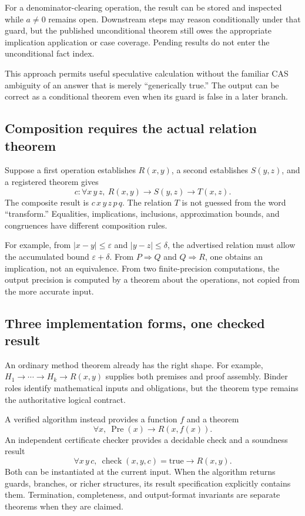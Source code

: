 \documentclass[11pt,letterpaper]{article}
\theoremstyle{definition}
\begin{document}
For a denominator-clearing operation, the result can be stored and inspected while
\(a\ne0\) remains open. Downstream steps may reason conditionally under that guard,
but the published unconditional theorem still owes the appropriate implication
application or case coverage. Pending results do not enter the unconditional fact
index.

This approach permits useful speculative calculation without the familiar CAS
ambiguity of an answer that is merely ``generically true.'' The output can be
correct as a conditional theorem even when its guard is false in a later branch.

\subsection{Composition requires the actual relation theorem}
Suppose a first operation establishes \(R(x,y)\), a second establishes \(S(y,z)\),
and a registered theorem gives
\[
 c:\forall x\,y\,z,\ R(x,y)\to S(y,z)\to T(x,z).
\]
The composite result is \(c\,x\,y\,z\,p\,q\). The relation \(T\) is not guessed
from the word ``transform.'' Equalities, implications, inclusions, approximation
bounds, and congruences have different composition rules.

For example, from \(|x-y|\le\varepsilon\) and \(|y-z|\le\delta\), the advertised
relation must allow the accumulated bound \(\varepsilon+\delta\). From
\(P\Rightarrow Q\) and \(Q\Rightarrow R\), one obtains an implication, not an
equivalence. From two finite-precision computations, the output precision is
computed by a theorem about the operations, not copied from the more accurate
input.

\subsection{Three implementation forms, one checked result}
An ordinary method theorem already has the right shape. For example,
\(H_1\to\cdots\to H_k\to R(x,y)\) supplies both premises and proof assembly.
Binder roles identify mathematical inputs and obligations, but the theorem type
remains the authoritative logical contract.

A verified algorithm instead provides a function \(f\) and a theorem
\[
 \forall x,\ \operatorname{Pre}(x)\to R(x,f(x)).
\]
An independent certificate checker provides a decidable check and a soundness
result
\[
 \forall x\,y\,c,\ \operatorname{check}(x,y,c)=\mathrm{true}
 \to R(x,y).
\]
Both can be instantiated at the current input. When the algorithm returns guards,
branches, or richer structures, its result specification explicitly contains them.
Termination, completeness, and output-format invariants are separate theorems
when they are claimed.
\end{document}
